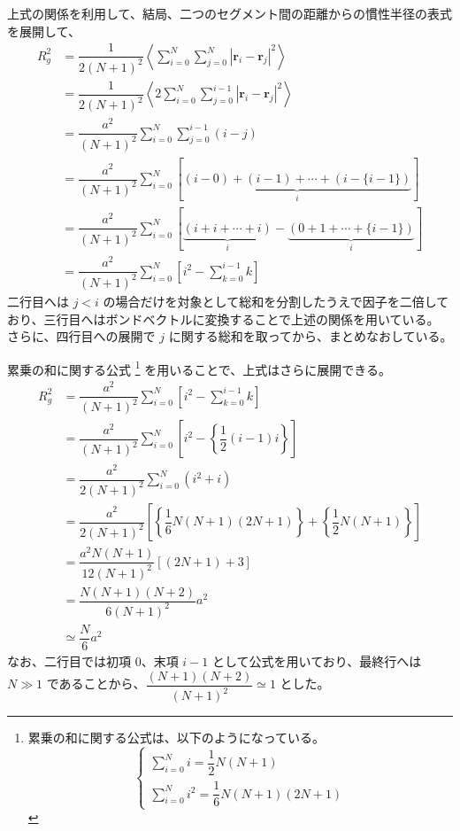 \documentclass[11pt]{jsarticle}
\begin{document}
\begin{appendix}
上式の関係を利用して、結局、二つのセグメント間の距離からの慣性半径の表式を展開して、
\begin{align*}
R_g^2 
	&= \dfrac{1}{2(N+1)^2} \left \langle \sum_{i=0}^N \sum_{j=0}^N \left|\bm{r}_i - \bm{r}_j \right|^2 \right \rangle\\
	&= \dfrac{1}{2(N+1)^2} \left \langle 2 \sum_{i=0}^N \sum_{j=0}^{i-1} \left|\bm{r}_i - \bm{r}_j \right|^2 \right \rangle\\
	&= \dfrac{a^2}{(N+1)^2} \sum_{i=0}^N \sum_{j=0}^{i-1} (i -j) \\
	&= \dfrac{a^2}{(N+1)^2} \sum_{i=0}^N \left[ \underbrace{(i -0) +(i -1) + \cdots + (i -\{i-1\} ) }_i \right]\\
	&= \dfrac{a^2}{(N+1)^2} \sum_{i=0}^N \left[ \underbrace{(i+i+ \cdots +i ) }_i - \underbrace{(0+1+ \cdots + \{i-1\} ) }_i\right]\\
	&= \dfrac{a^2}{(N+1)^2} \sum_{i=0}^N \left[ i^2 - \sum_{k=0}^{i-1} k \right]
\end{align*}
二行目へは $j < i$ の場合だけを対象として総和を分割したうえで因子を二倍しており、三行目へはボンドベクトルに変換することで上述の関係を用いている。
さらに、四行目への展開で $j$ に関する総和を取ってから、まとめなおしている。

累乗の和に関する公式
\footnote{
累乗の和に関する公式は、以下のようになっている。
\begin{equation*}
\begin{cases}
\displaystyle \sum_{i=0}^{N} i = \dfrac{1}{2} N (N+1) \\[12pt]
\displaystyle \sum_{i=0}^{N} i^2 = \dfrac{1}{6} N (N+1)(2N+1)
\end{cases}
\end{equation*}
}
を用いることで、上式はさらに展開できる。
\begin{align*}
R_g^2
	&= \dfrac{a^2}{(N+1)^2} \sum_{i=0}^N \left[ i^2 - \sum_{k=0}^{i-1} k \right] \\
	&= \dfrac{a^2}{(N+1)^2} \sum_{i=0}^N \left[ i^2 - \left\{ \dfrac{1}{2} \left(i-1 \right) i \right\} \right] \\
	&= \dfrac{a^2}{2(N+1)^2} \sum_{i=0}^N (i^2 + i) \\
	&= \dfrac{a^2}{2(N+1)^2} \left[ \left\{ \dfrac{1}{6} N (N+1)(2N+1) \right\} + \left\{ \dfrac{1}{2} N (N + 1) \right\} \right] \\
	&= \dfrac{a^2 N(N+1)}{12(N+1)^2} [( 2N +1) +3] \\
	&= \dfrac{N(N+1)(N+2) }{6(N+1)^2} a^2\\
	&\simeq \dfrac{N}{6} a^2
\end{align*}
なお、二行目では初項 $0$、末項 $i-1$ として公式を用いており、最終行へは $N \gg 1$ であることから、$\dfrac{(N+1)(N+2) }{(N+1)^2}\simeq 1$ とした。


\end{appendix}
\end{document}
